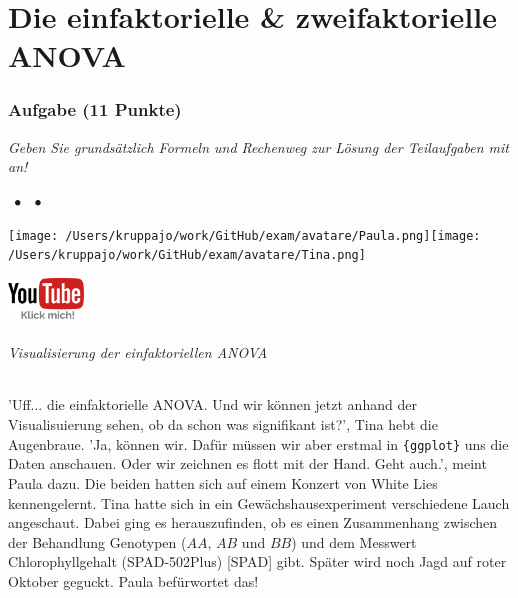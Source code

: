\documentclass[a4paper, 9pt]{scrartcl}\usepackage[]{graphicx}\usepackage[]{xcolor}
\begin{document}
\clearpage
\part{Die einfaktorielle \& zweifaktorielle ANOVA}

\section{Aufgabe \hfill (11 Punkte)}

\textit{Geben Sie grundsätzlich Formeln und Rechenweg zur Lösung der Teilaufgaben mit an!} \\[1Ex]
 

 
\ifcollection
\begin{flushright}
\tiny\vspace{-3Ex}
\textbf{\examinhaltstart}
\exammodulemathstat $\;\bullet$
\exammodulestat $\;\bullet$
\exammodulestatbbv 
\vspace{-4Ex}
\end{flushright}
\begin{minipage}[t]{0.5\textwidth}
\texttt{[image: /Users/kruppajo/work/GitHub/exam/avatare/Paula.png]}\hspace{-4mm}\texttt{[image: /Users/kruppajo/work/GitHub/exam/avatare/Tina.png]}
\end{minipage}
\begin{minipage}[t]{0.5\textwidth}
\hfill
\href{https://youtu.be/kHmfEmU6lrk}{\includegraphics[width = 2cm]{img/youtube}}
\end{minipage}
\fi



\ifcollection
\paragraph{Visualisierung der einfaktoriellen ANOVA}
\fi

'Uff... die einfaktorielle ANOVA. Und wir können jetzt anhand der Visualisuierung sehen, ob da schon was signifikant ist?', Tina hebt die Augenbraue. 'Ja, können wir. Dafür müssen wir aber erstmal in \texttt{\{ggplot\}} uns die Daten anschauen. Oder wir zeichnen es flott mit der Hand. Geht auch.', meint Paula dazu. Die beiden hatten sich auf einem Konzert von White Lies kennengelernt. Tina hatte sich in ein Gewächshausexperiment verschiedene Lauch angeschaut. Dabei ging es herauszufinden, ob es einen Zusammenhang zwischen der Behandlung Genotypen ($AA$, $AB$ und $BB$) und dem Messwert Chlorophyllgehalt (SPAD-502Plus) [SPAD] gibt. Später wird noch Jagd auf roter Oktober geguckt. Paula befürwortet das!
\end{document}
